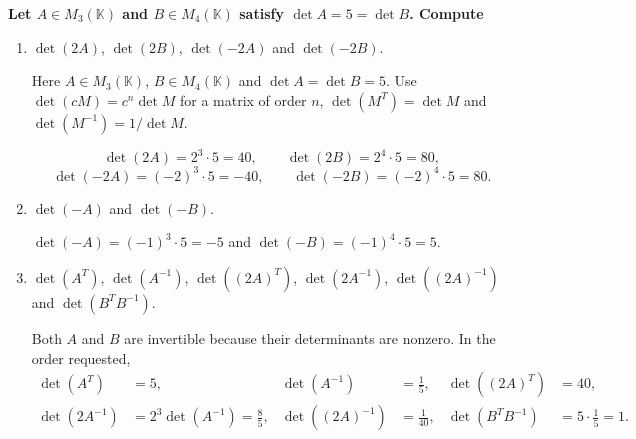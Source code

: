 \providecommand{\rank}{\operatorname{r}}
\providecommand{\RR}{\mathbb R}
\providecommand{\CC}{\mathbb C}
\providecommand{\KK}{\mathbb K}

\setcounter{enumi}{49}
\item {\bfseries\boldmath
Let $A\in M_3(\KK)$ and $B\in M_4(\KK)$ satisfy $\det A=5=\det B$. Compute
}

\begin{enumerate}[label=\alph*)]

\item $\det(2A)$, $\det(2B)$, $\det(-2A)$ and $\det(-2B)$.

\begin{answer}
Here $A\in M_3(\KK)$, $B\in M_4(\KK)$ and $\det A=\det B=5$.
Use $\det(cM)=c^n\det M$ for a matrix of order $n$,
$\det(M^T)=\det M$ and $\det(M^{-1})=1/\det M$.

\[
 \det(2A)=2^3\cdot5=40,\qquad \det(2B)=2^4\cdot5=80,
\]
\[
 \det(-2A)=(-2)^3\cdot5=-40,\qquad \det(-2B)=(-2)^4\cdot5=80.
\]
\end{answer}

\item $\det(-A)$ and $\det(-B)$.

\begin{answer}
$\det(-A)=(-1)^3\cdot5=-5$ and
$\det(-B)=(-1)^4\cdot5=5$.
\end{answer}

\item $\det(A^T)$, $\det(A^{-1})$, $\det((2A)^T)$, $\det(2A^{-1})$, $\det((2A)^{-1})$ and $\det(B^TB^{-1})$.

\begin{answer}
Both $A$ and $B$ are invertible because their determinants are nonzero.
In the order requested,
\[
\begin{aligned}
 \det(A^T)&=5, & \det(A^{-1})&=\tfrac15, &
 \det((2A)^T)&=40,\\
 \det(2A^{-1})&=2^3\det(A^{-1})=\tfrac85, &
 \det((2A)^{-1})&=\tfrac1{40}, &
 \det(B^TB^{-1})&=5\cdot\tfrac15=1.
\end{aligned}
\]
\end{answer}
\end{enumerate}
